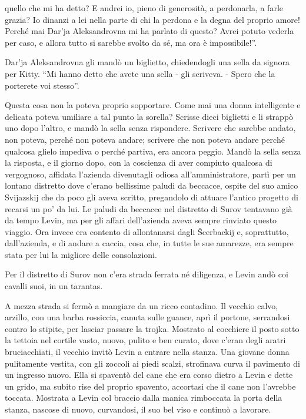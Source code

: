 quello che mi ha detto? E andrei io, pieno di generosità, a perdonarla, a farle grazia? Io dinanzi a lei nella parte di chi la perdona e la degna del proprio amore! Perché mai Dar'ja Aleksandrovna mi ha parlato di questo? Avrei potuto vederla per caso, e allora tutto si sarebbe svolto da sé, ma ora è impossibile!''. 

Dar'ja Aleksandrovna gli mandò un biglietto, chiedendogli una sella da signora per Kitty. ``Mi hanno detto che avete una sella - gli scriveva. - Spero che la porterete voi stesso''. 

Questa cosa non la poteva proprio sopportare. Come mai una donna intelligente e delicata poteva umiliare a tal punto la sorella? Scrisse dieci biglietti e li strappò uno dopo l'altro, e mandò la sella senza rispondere. Scrivere che sarebbe andato, non poteva, perché non poteva andare; scrivere che non poteva andare perché qualcosa glielo impediva o perché partiva, era ancora peggio. Mandò la sella senza la risposta, e il giorno dopo, con la coscienza di aver compiuto qualcosa di vergognoso, affidata l'azienda divenutagli odiosa all'amministratore, partì per un lontano distretto dove c'erano bellissime paludi da beccacce, ospite del suo amico Svijazskij che da poco gli aveva scritto, pregandolo di attuare l'antico progetto di recarsi un po' da lui. Le paludi da beccacce nel distretto di Surov tentavano già da tempo Levin, ma per gli affari dell'azienda aveva sempre rinviato questo viaggio. Ora invece era contento di allontanarsi dagli Šcerbackij e, soprattutto, dall'azienda, e di andare a caccia, cosa che, in tutte le sue amarezze, era sempre stata per lui la migliore delle consolazioni. 

\label{xxv-2} 

Per il distretto di Surov non c'era strada ferrata né diligenza, e Levin andò coi cavalli suoi, in un tarantas. 

A mezza strada si fermò a mangiare da un ricco contadino. Il vecchio calvo, arzillo, con una barba rossiccia, canuta sulle guance, aprì il portone, serrandosi contro lo stipite, per lasciar passare la trojka. Mostrato al cocchiere il posto sotto la tettoia nel cortile vasto, nuovo, pulito e ben curato, dove c'eran degli aratri bruciacchiati, il vecchio invitò Levin a entrare nella stanza. Una giovane donna pulitamente vestita, con gli zoccoli ai piedi scalzi, strofinava curva il pavimento di un ingresso nuovo. Ella si spaventò del cane che era corso dietro a Levin e dette un grido, ma subito rise del proprio spavento, accortasi che il cane non l'avrebbe toccata. Mostrata a Levin col braccio dalla manica rimboccata la porta della stanza, nascose di nuovo, curvandosi, il suo bel viso e continuò a lavorare. 

